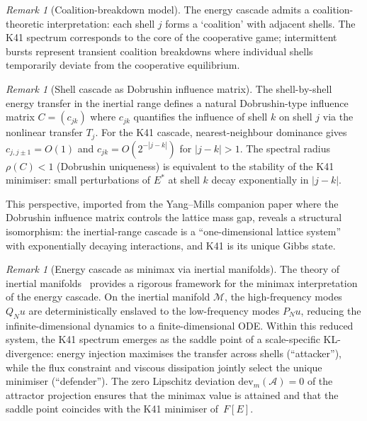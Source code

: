\documentclass[12pt,a4paper]{article}
\theoremstyle{definition}
\theoremstyle{plain}
\theoremstyle{remark}
\newtheorem{remark}[definition]{Remark}
\begin{document}
\begin{remark}[Coalition-breakdown model]
The energy cascade admits a coalition-theoretic interpretation: each shell $j$ forms a `coalition' with adjacent shells. The K41 spectrum corresponds to the core of the cooperative game; intermittent bursts represent transient coalition breakdowns where individual shells temporarily deviate from the cooperative equilibrium.
\end{remark}


\begin{remark}[Shell cascade as Dobrushin influence matrix]
\label{rem:dobrushin-cascade}
The shell-by-shell energy transfer in the inertial range defines a natural Dobrushin-type influence matrix $C = (c_{jk})$ where $c_{jk}$ quantifies the influence of shell $k$ on shell $j$ via the nonlinear transfer $T_j$. For the K41 cascade, nearest-neighbour dominance gives $c_{j,j\pm 1} = O(1)$ and $c_{jk} = O(2^{-|j-k|})$ for $|j-k| > 1$. The spectral radius $\rho(C) < 1$ (Dobrushin uniqueness) is equivalent to the stability of the K41 minimiser: small perturbations of $E^*$ at shell $k$ decay exponentially in $|j-k|$.

This perspective, imported from the Yang--Mills companion paper where the Dobrushin influence matrix controls the lattice mass gap, reveals a structural isomorphism: the inertial-range cascade is a ``one-dimensional lattice system'' with exponentially decaying interactions, and K41 is its unique Gibbs state.
\end{remark}

\begin{remark}[Energy cascade as minimax via inertial manifolds]
\label{rem:minimax-inertial}
The theory of inertial manifolds~\cite{FoiasSellTemam88} provides a rigorous framework
for the minimax interpretation of the energy cascade. On the inertial manifold
$\mathcal{M}$, the high-frequency modes $Q_N u$ are deterministically enslaved to
the low-frequency modes $P_N u$, reducing the infinite-dimensional dynamics to a
finite-dimensional ODE\@. Within this reduced system, the K41 spectrum emerges as
the saddle point of a scale-specific KL-divergence: energy injection maximises the
transfer across shells (``attacker''), while the flux constraint and viscous
dissipation jointly select the unique minimiser (``defender''). The zero
Lipschitz deviation $\mathrm{dev}_m(\mathcal{A}) = 0$ of the attractor projection
ensures that the minimax value is attained and that the saddle point coincides
with the K41 minimiser of~$F[E]$.
\end{remark}
\end{document}
